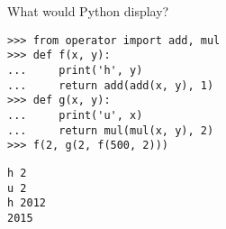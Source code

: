 \question What would Python display?

\begin{lstlisting}
>>> from operator import add, mul
>>> def f(x, y):
...     print('h', y)
...     return add(add(x, y), 1)
>>> def g(x, y):
...     print('u', x)
...     return mul(mul(x, y), 2)
>>> f(2, g(2, f(500, 2)))
\end{lstlisting}

\begin{solution}[1in]
\begin{lstlisting}
h 2
u 2
h 2012
2015
\end{lstlisting}
\end{solution}
